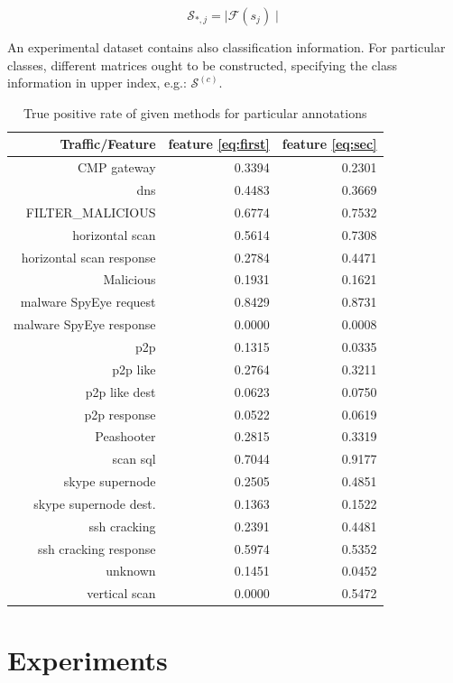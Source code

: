 \documentclass[a4paper,journal]{IEEEtran}
\begin{document}
\begin{equation}
\mathcal{S}_{*,j} = \mid\mathcal{F}(s_{j})\mid
\end{equation}

An experimental dataset contains also classification information. For particular classes,
different matrices ought to be constructed, specifying the class information in upper index, 
e.g.: $\mathcal{S}^{(c)}$.


\begin{table}[b!]
\begin{center}
\caption{True positive rate of given methods for particular annotations}
\begin{tabular}{r|rr}
Traffic/Feature & feature \ref{eq:first} &  feature \ref{eq:sec} \\ \hline
CMP gateway & 0.3394 & 0.2301\\
dns & 0.4483 & 0.3669\\
FILTER\_MALICIOUS & 0.6774 & 0.7532\\
horizontal scan & 0.5614 & 0.7308 \\
horizontal scan response & 0.2784 & 0.4471\\
Malicious & 0.1931 & 0.1621\\
malware SpyEye request & 0.8429 & 0.8731\\
malware SpyEye response & 0.0000 & 0.0008 \\
p2p & 0.1315 & 0.0335 \\
p2p like & 0.2764 & 0.3211\\
p2p like dest & 0.0623 & 0.0750\\
p2p response & 0.0522 & 0.0619\\
Peashooter & 0.2815 & 0.3319\\
scan sql & 0.7044 & 0.9177\\
skype supernode & 0.2505 & 0.4851\\
skype supernode dest. & 0.1363 & 0.1522 \\
ssh cracking & 0.2391 & 0.4481 \\
ssh cracking response & 0.5974 & 0.5352\\
unknown & 0.1451 & 0.0452\\
vertical scan & 0.0000 & 0.5472\\
\end{tabular}
\end{center}
\label{tbl:tp}
\end{table}

\section{Experiments}\label{sec:experiments}
\end{document}
